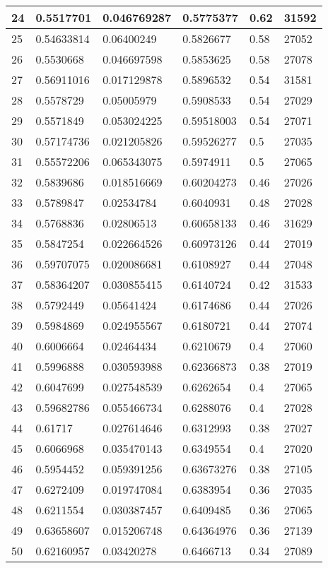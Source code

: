 \begin{longtable}{|l|l|l|l|l|l|}
24 & 0.5517701 & 0.046769287 & 0.5775377 & 0.62 & 31592 \\ \hline 
25 & 0.54633814 & 0.06400249 & 0.5826677 & 0.58 & 27052 \\ \hline 
26 & 0.5530668 & 0.046697598 & 0.5853625 & 0.58 & 27078 \\ \hline 
27 & 0.56911016 & 0.017129878 & 0.5896532 & 0.54 & 31581 \\ \hline 
28 & 0.5578729 & 0.05005979 & 0.5908533 & 0.54 & 27029 \\ \hline 
29 & 0.5571849 & 0.053024225 & 0.59518003 & 0.54 & 27071 \\ \hline 
30 & 0.57174736 & 0.021205826 & 0.59526277 & 0.5 & 27035 \\ \hline 
31 & 0.55572206 & 0.065343075 & 0.5974911 & 0.5 & 27065 \\ \hline 
32 & 0.5839686 & 0.018516669 & 0.60204273 & 0.46 & 27026 \\ \hline 
33 & 0.5789847 & 0.02534784 & 0.6040931 & 0.48 & 27028 \\ \hline 
34 & 0.5768836 & 0.02806513 & 0.60658133 & 0.46 & 31629 \\ \hline 
35 & 0.5847254 & 0.022664526 & 0.60973126 & 0.44 & 27019 \\ \hline 
36 & 0.59707075 & 0.020086681 & 0.6108927 & 0.44 & 27048 \\ \hline 
37 & 0.58364207 & 0.030855415 & 0.6140724 & 0.42 & 31533 \\ \hline 
38 & 0.5792449 & 0.05641424 & 0.6174686 & 0.44 & 27026 \\ \hline 
39 & 0.5984869 & 0.024955567 & 0.6180721 & 0.44 & 27074 \\ \hline 
40 & 0.6006664 & 0.02464434 & 0.6210679 & 0.4 & 27060 \\ \hline 
41 & 0.5996888 & 0.030593988 & 0.62366873 & 0.38 & 27019 \\ \hline 
42 & 0.6047699 & 0.027548539 & 0.6262654 & 0.4 & 27065 \\ \hline 
43 & 0.59682786 & 0.055466734 & 0.6288076 & 0.4 & 27028 \\ \hline 
44 & 0.61717 & 0.027614646 & 0.6312993 & 0.38 & 27027 \\ \hline 
45 & 0.6066968 & 0.035470143 & 0.6349554 & 0.4 & 27020 \\ \hline 
46 & 0.5954452 & 0.059391256 & 0.63673276 & 0.38 & 27105 \\ \hline 
47 & 0.6272409 & 0.019747084 & 0.6383954 & 0.36 & 27035 \\ \hline 
48 & 0.6211554 & 0.030387457 & 0.6409485 & 0.36 & 27065 \\ \hline 
49 & 0.63658607 & 0.015206748 & 0.64364976 & 0.36 & 27139 \\ \hline 
50 & 0.62160957 & 0.03420278 & 0.6466713 & 0.34 & 27089 \\ \hline 
\end{longtable}